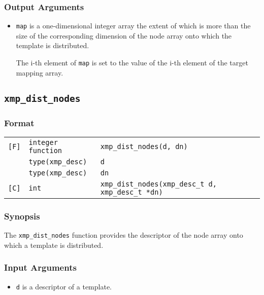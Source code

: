 \subsubsection*{Output Arguments}
\begin{itemize}
 \item {\tt map} is a one-dimensional integer array the extent of which
       is more than the size of the corresponding
       dimension of the node array onto which the template is
       distributed.

       The i-th element of {\tt map} is set to the value of the i-th
       element of the target mapping array.
\end{itemize}


\subsection{\tt xmp\_dist\_nodes}

\subsubsection*{Format}

\begin{tabular}{lll}

\verb![F]!& {\tt integer function}& {\tt xmp\_dist\_nodes(d, dn)}\\
          & {\tt type(xmp\_desc)} & {\tt d}\\
          & {\tt type(xmp\_desc)} & {\tt dn}\\

\verb![C]!&  {\tt int}& {\tt xmp\_dist\_nodes(xmp\_desc\_t d, xmp\_desc\_t *dn)}\\

\end{tabular}

\subsubsection*{Synopsis}

The {\tt xmp\_dist\_nodes} function provides the descriptor of the node
array onto which a template is distributed.


\subsubsection*{Input Arguments}
\begin{itemize}
 \item {\tt d} is a descriptor of a template.
\end{itemize}

